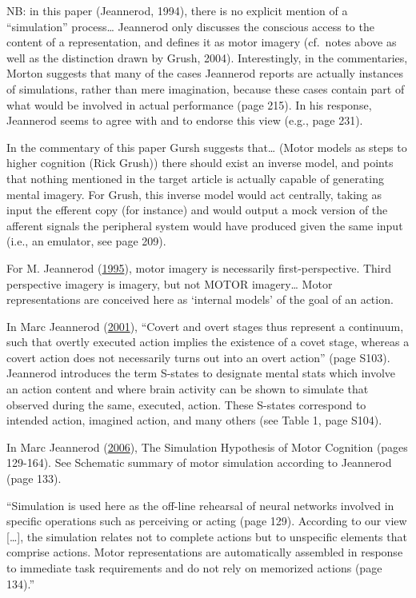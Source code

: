 \documentclass[a4paper,12pt,twoside,openright,oldfontcommands]{memoir}
\begin{document}
NB: in this paper (Jeannerod, 1994), there is no explicit mention of a
``simulation'' process\ldots{} Jeannerod only discusses the conscious
access to the content of a representation, and defines it as motor
imagery (cf.~notes above as well as the distinction drawn by Grush,
2004). Interestingly, in the commentaries, Morton suggests that many of
the cases Jeannerod reports are actually instances of simulations,
rather than mere imagination, because these cases contain part of what
would be involved in actual performance (page 215). In his response,
Jeannerod seems to agree with and to endorse this view (e.g., page 231).

In the commentary of this paper Gursh suggests that\ldots{} (Motor
models as steps to higher cognition (Rick Grush)) there should exist an
inverse model, and points that nothing mentioned in the target article
is actually capable of generating mental imagery. For Grush, this
inverse model would act centrally, taking as input the efferent copy
(for instance) and would output a mock version of the afferent signals
the peripheral system would have produced given the same input (i.e., an
emulator, see page 209).

For M. Jeannerod (\protect\hyperlink{ref-jeannerod_mental_1995}{1995}),
motor imagery is necessarily first-perspective. Third perspective
imagery is imagery, but not MOTOR imagery\ldots{} Motor representations
are conceived here as `internal models' of the goal of an action.

In Marc Jeannerod (\protect\hyperlink{ref-jeannerod_neural_2001}{2001}),
``Covert and overt stages thus represent a continuum, such that overtly
executed action implies the existence of a covet stage, whereas a covert
action does not necessarily turns out into an overt action'' (page
S103). Jeannerod introduces the term S-states to designate mental stats
which involve an action content and where brain activity can be shown to
simulate that observed during the same, executed, action. These S-states
correspond to intended action, imagined action, and many others (see
Table 1, page S104).

In Marc Jeannerod (\protect\hyperlink{ref-jeannerod_motor_2006}{2006}),
The Simulation Hypothesis of Motor Cognition (pages 129-164). See
Schematic summary of motor simulation according to Jeannerod (page 133).

``Simulation is used here as the off-line rehearsal of neural networks
involved in specific operations such as perceiving or acting (page 129).
According to our view {[}\ldots{}{]}, the simulation relates not to
complete actions but to unspecific elements that comprise actions. Motor
representations are automatically assembled in response to immediate
task requirements and do not rely on memorized actions (page 134).''
\end{document}
